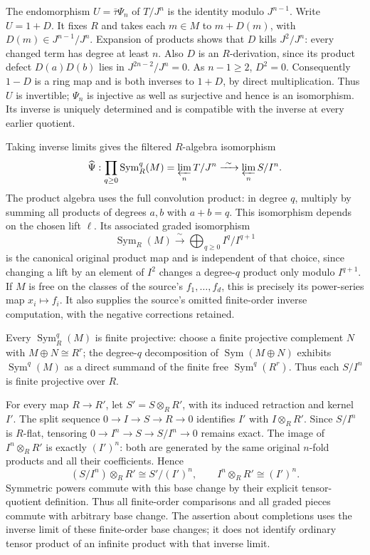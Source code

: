 The endomorphism \(U=\bar\tau\Psi_n\) of \(T/J^n\) is the identity modulo \(J^{n-1}\). Write \(U=1+D\). It fixes \(R\) and takes each \(m\in M\) to \(m+D(m)\), with \(D(m)\in J^{n-1}/J^n\). Expansion of products shows that \(D\) kills \(J^2/J^n\): every changed term has degree at least \(n\). Also \(D\) is an \(R\)-derivation, since its product defect \(D(a)D(b)\) lies in \(J^{2n-2}/J^n=0\). As \(n-1\ge2\), \(D^2=0\). Consequently \(1-D\) is a ring map and is both inverses to \(1+D\), by direct multiplication. Thus \(U\) is invertible; \(\Psi_n\) is injective as well as surjective and hence is an isomorphism. Its inverse is uniquely determined and is compatible with the inverse at every earlier quotient.

Taking inverse limits gives the filtered \(R\)-algebra isomorphism \[
\widehat\Psi:\prod_{q\ge0}\operatorname{Sym}_R^q(M)
=\varprojlim_n T/J^n
\xrightarrow{\ \sim\ }\varprojlim_n S/I^n.
\] The product algebra uses the full convolution product: in degree \(q\), multiply by summing all products of degrees \(a,b\) with \(a+b=q\). This isomorphism depends on the chosen lift \(\ell\). Its associated graded isomorphism \[
\operatorname{Sym}_R(M)\xrightarrow{\ \sim\ }\bigoplus_{q\ge0}I^q/I^{q+1}
\] is the canonical original product map and is independent of that choice, since changing a lift by an element of \(I^2\) changes a degree-\(q\) product only modulo \(I^{q+1}\). If \(M\) is free on the classes of the source's \(f_1,\ldots,f_d\), this is precisely its power-series map \(x_i\mapsto f_i\). It also supplies the source's omitted finite-order inverse computation, with the negative corrections retained.

Every \(\operatorname{Sym}_R^q(M)\) is finite projective: choose a finite projective complement \(N\) with \(M\oplus N\cong R^r\); the degree-\(q\) decomposition of \(\operatorname{Sym}(M\oplus N)\) exhibits \(\operatorname{Sym}^q(M)\) as a direct summand of the finite free \(\operatorname{Sym}^q(R^r)\). Thus each \(S/I^n\) is finite projective over \(R\).

For every map \(R\to R'\), let \(S'=S\otimes_RR'\), with its induced retraction and kernel \(I'\). The split sequence \(0\to I\to S\to R\to0\) identifies \(I'\) with \(I\otimes_RR'\). Since \(S/I^n\) is \(R\)-flat, tensoring \(0\to I^n\to S\to S/I^n\to0\) remains exact. The image of \(I^n\otimes_RR'\) is exactly \((I')^n\): both are generated by the same original \(n\)-fold products and all their coefficients. Hence \[
(S/I^n)\otimes_RR'\cong S'/(I')^n,\qquad
I^n\otimes_RR'\cong(I')^n.
\] Symmetric powers commute with this base change by their explicit tensor-quotient definition. Thus all finite-order comparisons and all graded pieces commute with arbitrary base change. The assertion about completions uses the inverse limit of these finite-order base changes; it does not identify ordinary tensor product of an infinite product with that inverse limit.

